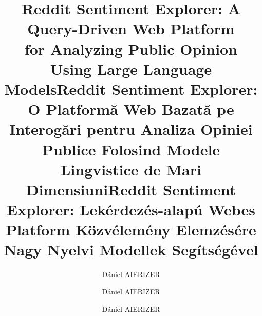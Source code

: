 \documentclass[12pt]{report}
\begin{document}
\hypersetup{pageanchor=false}

\title{Reddit Sentiment Explorer: A Query-Driven Web Platform \\ for Analyzing Public Opinion Using Large Language Models}
\author{Dániel AIERIZER}
\maketitle

\title{Reddit Sentiment Explorer: O Platformă Web Bazată pe Interogări pentru Analiza Opiniei Publice Folosind Modele Lingvistice de Mari Dimensiuni}
\author{Dániel AIERIZER}
\maketitle

\title{Reddit Sentiment Explorer: Lekérdezés-alapú Webes Platform Közvélemény Elemzésére Nagy Nyelvi Modellek Segítségével}
\author{Dániel AIERIZER}
\maketitle


\newpage
{}
\hypersetup{pageanchor=true}



\tableofcontents
\newpage
\end{document}
